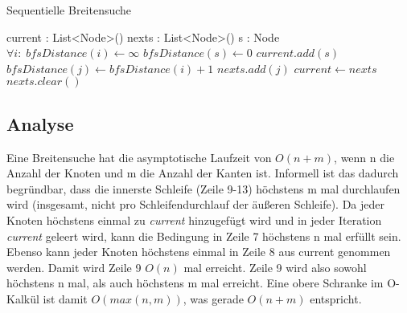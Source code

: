 \begin{algorithm}
	\caption{Sequentielle Breitensuche}
	\label{alg:sequential_bfs}
	\begin{algorithmic}[1]
		\State current : List<Node>()
		\State nexts : List<Node>()
		\State s : Node
		\State  $\forall i: \; bfsDistance(i) \gets \infty$
		\State $bfsDistance(s) \gets 0$
		\State $current.add(s)$
						\State $bfsDistance(j) \gets bfsDistance(i) + 1$
						\State $nexts.add(j)$
					\EndIf
				\EndFor
			\EndFor
			\State $current \gets nexts$
			\State $nexts.clear()$
		\EndWhile
	\end{algorithmic}
\end{algorithm}


\subsection{Analyse} %
\label{sub:analyse}
Eine Breitensuche hat die asymptotische Laufzeit von $O(n + m)$, wenn n die Anzahl der Knoten und m die Anzahl der Kanten ist. Informell ist das dadurch begründbar, dass die innerste Schleife (Zeile 9-13) höchstens m mal durchlaufen wird (insgesamt, nicht pro Schleifendurchlauf der äußeren Schleife). Da jeder Knoten höchstens einmal zu \textit{current} hinzugefügt wird und in jeder Iteration \textit{current} geleert wird, kann die Bedingung in Zeile 7 höchstens n mal erfüllt sein. Ebenso kann jeder Knoten höchstens einmal in Zeile 8 aus current genommen werden. Damit wird Zeile 9 $O(n)$ mal erreicht. Zeile 9 wird also sowohl höchstens n mal, als auch höchstens m mal erreicht. Eine obere Schranke im O-Kalkül ist damit $O(max(n,m))$, was gerade $O(n + m)$ entspricht.


